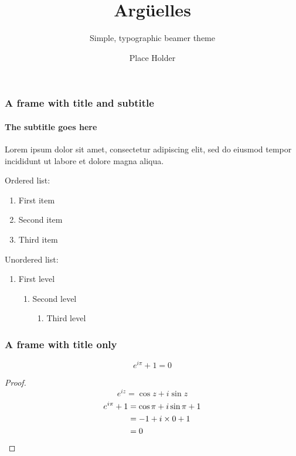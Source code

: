 \documentclass{beamer}
\title{Argüelles}
\subtitle{Simple, typographic beamer theme}
\date{}
\author{Place Holder}
\institute{University of \TeX\par\email{username@domain.com}}
\begin{document}
  \frame[plain]{\titlepage}


  \begin{frame}
    \frametitle{A frame with title and subtitle}
    \framesubtitle{The subtitle goes here}
    Lorem ipsum dolor sit amet, consectetur adipiscing elit, sed do eiusmod tempor incididunt ut labore et dolore magna aliqua.\par
    \vfill
    Ordered list:
    \begin{enumerate}
      \item First item
      \item Second item
      \item Third item
    \end{enumerate}
    \vfill
    Unordered list:
    \begin{enumerate}[$\bullet$]
      \item First level
      \begin{enumerate}[$\circ$]
        \item Second level
        \begin{enumerate}[\textbullet]
          \item Third level
        \end{enumerate}
      \end{enumerate}
    \end{enumerate}
  \end{frame}

  \begin{frame}
    \frametitle{A frame with title only}
    \begin{theorem}
      \[e^{i\pi}+1=0\]
      \begin{proof}
        \begin{equation*}
          e^{iz}=\cos{z}+i\sin{z}
        \end{equation*}
        \begin{align*}
          e^{i\pi}+1 & \null=\cos\pi+i\sin\pi+1 \\
          & \null=-1+i\times0+1 \\
          & \null=0
        \end{align*}
      \end{proof}
    \end{theorem}
  \end{frame}
\end{document}
